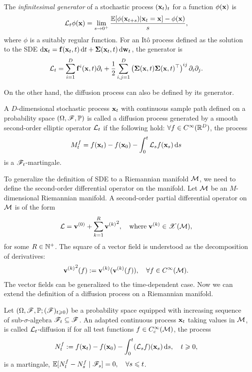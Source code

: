 \begin{definition}\label{def:generator}
The \emph{infinitesimal generator} of a stochastic process $(\mathbf{x}_t)_t$ for a function $\phi(\mathbf{x})$ is
    \begin{equation}
        \mathcal{L}_t \phi(\mathbf{x}) = \lim_{s\to0^+}\frac{\mathbb{E} [\phi(\mathbf{x}_{t+s})|\mathbf{x}_{t}=\mathbf{x}]-\phi(\mathbf{x})}{s},
    \end{equation}
     where $\phi$ is a suitably regular function. For an Itô process defined as the solution to the SDE $\mathrm{d} \mathbf{x}_t=\mathbf{f}(\mathbf{x}_t,t) \,\mathrm{d} t + \mathbf{\Sigma}(\mathbf{x}_t,t) \,\mathrm{d} \mathbf{w}_t$, the generator is
     \begin{equation}
         \mathcal{L}_t = \sum_{i=1}^D \mathbf{f}^i(\mathbf{x},t) \partial_i + \frac{1}{2} \sum_{i,j=1}^D \left( \mathbf{\Sigma}(\mathbf{x}, t) \mathbf{\Sigma}(\mathbf{x}, t)^{\top} \right)^{ij} \partial_i \partial_j.
     \end{equation}
\end{definition}
On the other hand, the diffusion process can also be defined by its generator. 
\begin{definition}
     A $D$-dimensional stochastic process $\mathbf{x}_t$ with continuous sample path defined on a probability space $(\Omega,\mathscr{F},\mathbb{P})$ is called a diffusion process generated by a smooth second-order elliptic operator $\mathcal{L}_t$ if the following hold: $\forall f \in C^\infty(\mathbb{R}^D)$, the process
    \begin{align}
        M^f_t=f(\mathbf{x}_t)-f(\mathbf{x}_0)-\int_0^t \mathcal{L}_s f(\mathbf{x}_s) \,\mathrm{d} s
    \end{align}
    is a $\mathscr{F}_t$-martingale.
\end{definition}
To generalize the definition of SDE to a Riemannian manifold $\mathcal{M}$, we need to define the second-order differential operator on the manifold. Let $\mathcal{M}$ be an $M$-dimensional Riemannian manifold. A second-order partial differential operator on $\mathcal{M}$ is of the form
\begin{align}
    \mathcal{L}=\mathbf{v}^{(0)}+\sum_{k=1}^R {\mathbf{v}^{(k)}}^2, \quad\text{where}\; \mathbf{v}^{(k)}\in\mathscr{X}(\mathcal{M}),
\end{align}
for some $R \in \mathbb{N}^+$. The square of a vector field is understood as the decomposition of derivatives:
\begin{align}
    {\mathbf{v}^{(k)}}^2 (f) := \mathbf{v}^{(k)}(\mathbf{v}^{(k)}(f)),\quad\forall f\in C^\infty(\mathcal{M}).
\end{align}
The vector fields can be generalized to the time-dependent case. Now we can extend the definition of a diffusion process on a Riemannian manifold.
\begin{definition}
    \citep[Def.~1.1.3]{thalmaier2023stochastic} Let $(\Omega,\mathscr{F},\mathbb{P};(\mathscr{F})_{t\geqslant0})$ be a probability space equipped with increasing sequence of sub-$\sigma$-algebra $\mathscr{F}_t\subseteq\mathscr{F}$. An adapted continuous process $\mathbf{x}_t$ taking values in $\mathcal{M}$, is called $\mathcal{L}_t$-diffusion if for all test functions $f\in C^\infty_c(\mathcal{M})$, the process
    \begin{align}
        N_t^f:=f(\mathbf{x}_t)-f(\mathbf{x}_0)-\int_0^t(\mathcal{L}_s f)(\mathbf{x}_s) \,\mathrm{d} s, \quad t\geqslant0,
    \end{align}
    is a martingale, \ie $\mathbb{E}[N_t^f-N_s^f\mid \mathscr{F}_s]=0,\quad\forall s\leqslant t$.
\end{definition}


